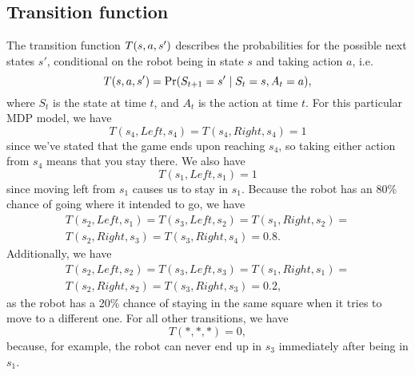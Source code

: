 \documentclass[a4paper]{article}
\begin{document}
\subsection{Transition function}
The transition function $T(s, a, s')$ describes the probabilities for
the possible next states $s'$, conditional on the robot being in state $s$
and taking action $a$,
i.e.
\begin{equation*}
T(s, a, s') = \Pr(S_{t+1}=s' \mid S_t=s, A_t=a) ,
\end{equation*}
where $S_t$ is the state at time $t$, and $A_t$ is the action at time $t$.
For this particular MDP model, we have
\begin{equation*}
T(s_4, Left, s_4) = T(s_4, Right, s_4) = 1
\end{equation*}
since we've stated that the game ends upon reaching $s_4$, so taking
either action from $s_4$ means that you stay there.
We also have
\begin{equation*}
T(s_1, Left, s_1) = 1
\end{equation*}
since moving left from $s_1$ causes us to stay in $s_1$.
Because the robot has an 80\% chance of going where it intended to go,
we have
\begin{gather*}
T(s_2, Left, s_1) =
T(s_3, Left, s_2) =
T(s_1, Right, s_2) =\\
T(s_2, Right, s_3) =
T(s_3, Right, s_4) = 0.8 .
\end{gather*}
Additionally, we have
\begin{gather*}
T(s_2, Left, s_2) =
T(s_3, Left, s_3) =
T(s_1, Right, s_1) =\\
T(s_2, Right, s_2) =
T(s_3, Right, s_3) = 0.2 ,
\end{gather*}
as the robot has a 20\% chance of staying in the same square when it
tries to move to a different one.
For all other transitions, we have
\begin{equation*}
  T(*, *, *) = 0 ,
\end{equation*}
because, for example, the robot can never end up in $s_3$ immediately
after being in $s_1$.
\end{document}
